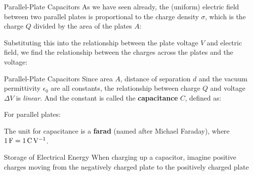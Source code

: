 \documentclass[12pt,aspectratio=169]{beamer}
\begin{document}
\begin{frame}{Parallel-Plate Capacitors}
  As we have seen already, the (uniform) electric field between two parallel
  plates is proportional to the charge density $\sigma$, which is the charge
  $Q$ divided by the area of the plates $A$:

  
  Substituting this into the relationship between the plate voltage $V$ and
  electric field, we find the relationship between the charges across the
  plates and the voltage:

\end{frame}



\begin{frame}{Parallel-Plate Capacitors}
  Since area $A$, distance of separation $d$ and the vacuum permittivity
  $\epsilon_0$ are all constants, the relationship between charge $Q$ and
  voltage $\Delta V$ is \emph{linear}. And the constant is called the
  \textbf{capacitance} $C$, defined as:


  For parallel plates:


  The unit for capacitance is a \textbf{farad} (named after Michael Faraday),
  where $\SI1\farad=\SI1{\coulomb\per\volt}$.
\end{frame}



\begin{frame}{Storage of Electrical Energy}
  When charging up a capacitor, imagine positive charges moving from the
  negatively charged plate to the positively charged plate
  \begin{center}
  \end{center}
\end{frame}
\end{document}
